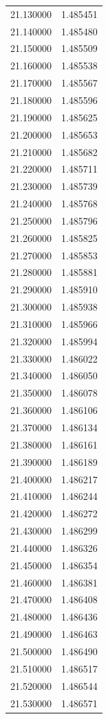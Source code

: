 \begin{tabular}{rr}
21.130000 & 1.485451 \\
21.140000 & 1.485480 \\
21.150000 & 1.485509 \\
21.160000 & 1.485538 \\
21.170000 & 1.485567 \\
21.180000 & 1.485596 \\
21.190000 & 1.485625 \\
21.200000 & 1.485653 \\
21.210000 & 1.485682 \\
21.220000 & 1.485711 \\
21.230000 & 1.485739 \\
21.240000 & 1.485768 \\
21.250000 & 1.485796 \\
21.260000 & 1.485825 \\
21.270000 & 1.485853 \\
21.280000 & 1.485881 \\
21.290000 & 1.485910 \\
21.300000 & 1.485938 \\
21.310000 & 1.485966 \\
21.320000 & 1.485994 \\
21.330000 & 1.486022 \\
21.340000 & 1.486050 \\
21.350000 & 1.486078 \\
21.360000 & 1.486106 \\
21.370000 & 1.486134 \\
21.380000 & 1.486161 \\
21.390000 & 1.486189 \\
21.400000 & 1.486217 \\
21.410000 & 1.486244 \\
21.420000 & 1.486272 \\
21.430000 & 1.486299 \\
21.440000 & 1.486326 \\
21.450000 & 1.486354 \\
21.460000 & 1.486381 \\
21.470000 & 1.486408 \\
21.480000 & 1.486436 \\
21.490000 & 1.486463 \\
21.500000 & 1.486490 \\
21.510000 & 1.486517 \\
21.520000 & 1.486544 \\
21.530000 & 1.486571 \\

\end{tabular}
